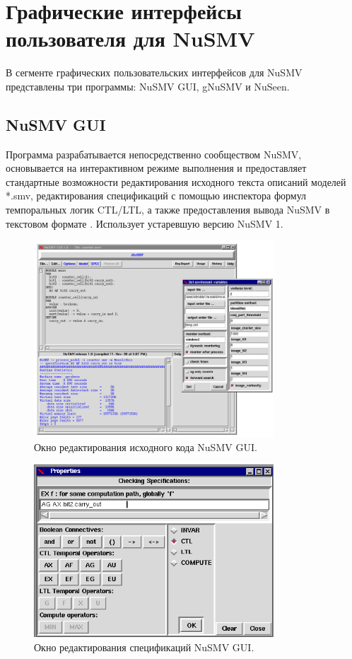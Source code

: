 \section{Графические интерфейсы пользователя для NuSMV}

В сегменте графических пользовательских интерфейсов для NuSMV представлены три программы: NuSMV GUI, gNuSMV и NuSeen.

\subsection{NuSMV GUI}

Программа разрабатывается непосредственно сообществом NuSMV, основывается на интерактивном режиме выполнения и предоставляет стандартные возможности редактирования исходного текста описаний моделей *.smv, редактирования спецификаций с помощью инспектора формул темпоральных логик CTL/LTL, а также предоставления вывода NuSMV в текстовом формате \cite{nusmv-gui}. Использует устаревшую версию NuSMV 1.

\begin{figure}[htbp]
	\centering
	\includegraphics[width=0.8\textwidth]{fig/nusmv_gui1.png}
	\caption{Окно редактирования исходного кода NuSMV GUI.}
	\label{fig:nusmv_gui1}
\end{figure}

\begin{figure}[htbp]
	\centering
	\includegraphics[width=0.8\textwidth]{fig/nusmv_gui2.png}
	\caption{Окно редактирования спецификаций NuSMV GUI.}
	\label{fig:nusmv_gui2}
\end{figure}

